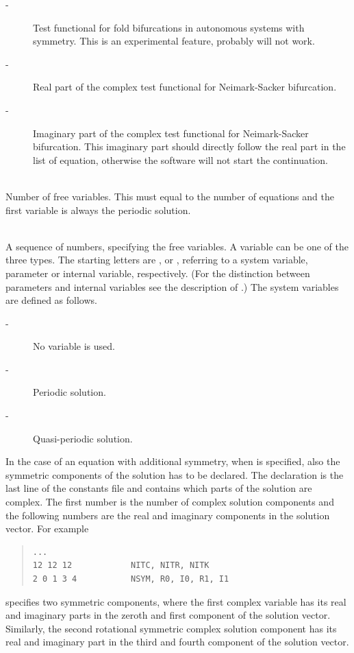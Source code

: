 \documentclass[10pt,a4paper]{ddedoc}
\begin{document}
\begin{description}
\begin{description}
\item[ -] Test functional for fold bifurcations in autonomous systems
with symmetry. This is an experimental feature, probably will not work.
\item[ -] Real part of the complex test functional for Neimark-Sacker
bifurcation.
\item[ -] Imaginary part of the complex test functional for
Neimark-Sacker bifurcation. This imaginary part should directly follow the real
part in the list of equation, otherwise the software will not start the
continuation.
\end{description}
\item[\funp{NVAR}] ~\\
	Number of free variables. This must equal to the number of equations and the
first variable is always the periodic solution.
\item[\funp{VAR}] ~\\
	A sequence of numbers, specifying the free variables. A variable can be one
of the three types. The starting letters are ,  or ,
referring to a system variable, parameter or internal variable, respectively.
(For the distinction between parameters and internal variables see the description of .) The
system variables are defined as follows.
\begin{description}
\item[ -] No variable is used.
\item[ -] Periodic solution.
\item[ -] Quasi-periodic solution.
\end{description}
In the case of an equation with additional symmetry, when  is
specified, also the symmetric components of the solution has to be declared.
The declaration is the last line of the constants file and contains which parts
of the solution are complex. The first number is the number of complex
solution components and the following numbers are the real and imaginary components in the solution
vector. For example
{ \small \begin{quote} \begin{lstlisting}[basicstyle=\tt,frame=single]
...
12 12 12            NITC, NITR, NITK
2 0 1 3 4           NSYM, R0, I0, R1, I1
\end{lstlisting} \end{quote} } \noindent
specifies two symmetric components, where the first complex variable has its
real and imaginary parts in the zeroth and first component of the solution
vector.
Similarly, the second rotational symmetric complex solution component has its
real and imaginary part in the third and fourth component of the solution
vector.
\end{description}
\end{document}
